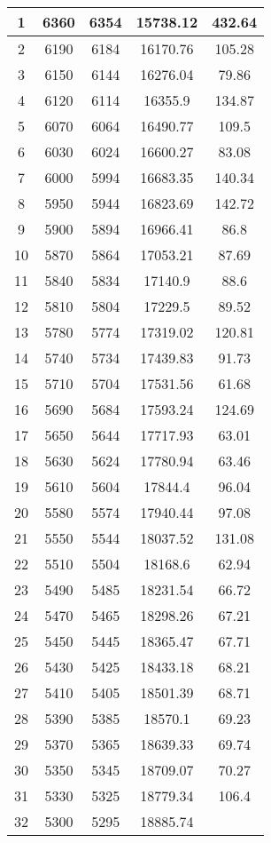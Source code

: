 \documentclass[9pt,a4paper]{article}
\begin{document}
\begin{multicols*}{2}
\begin{table}[H]
{\begin{tabular}{||c|c|c|c|c||}
1	&	6360	&	6354	&	15738.12	&	432.64	\\ \hline
2	&	6190	&	6184	&	16170.76	&	105.28	\\ \hline
3	&	6150	&	6144	&	16276.04	&	79.86	\\ \hline
4	&	6120	&	6114	&	16355.9	&	134.87	\\ \hline
5	&	6070	&	6064	&	16490.77	&	109.5	\\ \hline
6	&	6030	&	6024	&	16600.27	&	83.08	\\ \hline
7	&	6000	&	5994	&	16683.35	&	140.34	\\ \hline
8	&	5950	&	5944	&	16823.69	&	142.72	\\ \hline
9	&	5900	&	5894	&	16966.41	&	86.8	\\ \hline
10	&	5870	&	5864	&	17053.21	&	87.69	\\ \hline
11	&	5840	&	5834	&	17140.9	&	88.6	\\ \hline
12	&	5810	&	5804	&	17229.5	&	89.52	\\ \hline
13	&	5780	&	5774	&	17319.02	&	120.81	\\ \hline
14	&	5740	&	5734	&	17439.83	&	91.73	\\ \hline
15	&	5710	&	5704	&	17531.56	&	61.68	\\ \hline
16	&	5690	&	5684	&	17593.24	&	124.69	\\ \hline
17	&	5650	&	5644	&	17717.93	&	63.01	\\ \hline
18	&	5630	&	5624	&	17780.94	&	63.46	\\ \hline
19	&	5610	&	5604	&	17844.4	&	96.04	\\ \hline
20	&	5580	&	5574	&	17940.44	&	97.08	\\ \hline
21	&	5550	&	5544	&	18037.52	&	131.08	\\ \hline
22	&	5510	&	5504	&	18168.6	&	62.94	\\ \hline
23	&	5490	&	5485	&	18231.54	&	66.72	\\ \hline
24	&	5470	&	5465	&	18298.26	&	67.21	\\ \hline
25	&	5450	&	5445	&	18365.47	&	67.71	\\ \hline
26	&	5430	&	5425	&	18433.18	&	68.21	\\ \hline
27	&	5410	&	5405	&	18501.39	&	68.71	\\ \hline
28	&	5390	&	5385	&	18570.1	&	69.23	\\ \hline
29	&	5370	&	5365	&	18639.33	&	69.74	\\ \hline
30	&	5350	&	5345	&	18709.07	&	70.27	\\ \hline
31	&	5330	&	5325	&	18779.34	&	106.4	\\ \hline
32	&	5300	&	5295	&	18885.74	&		\\ \hline


\end{tabular}}
\end{table}
\end{multicols*}
\end{document}
